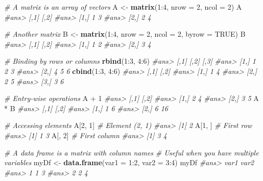 \documentclass[]{book}
\newenvironment{Shaded}{\begin{snugshade}}{\end{snugshade}}
\newcommand{\KeywordTok}[1]{\textcolor[rgb]{0.13,0.29,0.53}{\textbf{{#1}}}}
\newcommand{\DataTypeTok}[1]{\textcolor[rgb]{0.13,0.29,0.53}{{#1}}}
\newcommand{\DecValTok}[1]{\textcolor[rgb]{0.00,0.00,0.81}{{#1}}}
\newcommand{\StringTok}[1]{\textcolor[rgb]{0.31,0.60,0.02}{{#1}}}
\newcommand{\CommentTok}[1]{\textcolor[rgb]{0.56,0.35,0.01}{\textit{{#1}}}}
\newcommand{\OtherTok}[1]{\textcolor[rgb]{0.56,0.35,0.01}{{#1}}}
\newcommand{\NormalTok}[1]{{#1}}
\begin{document}
\begin{Shaded}
\begin{Highlighting}[]
\CommentTok{# A matrix is an array of vectors}
\NormalTok{A <-}\StringTok{ }\KeywordTok{matrix}\NormalTok{(}\DecValTok{1}\NormalTok{:}\DecValTok{4}\NormalTok{, }\DataTypeTok{nrow =} \DecValTok{2}\NormalTok{, }\DataTypeTok{ncol =} \DecValTok{2}\NormalTok{)}
\NormalTok{A}
\CommentTok{#ans>      [,1] [,2]}
\CommentTok{#ans> [1,]    1    3}
\CommentTok{#ans> [2,]    2    4}

\CommentTok{# Another matrix}
\NormalTok{B <-}\StringTok{ }\KeywordTok{matrix}\NormalTok{(}\DecValTok{1}\NormalTok{:}\DecValTok{4}\NormalTok{, }\DataTypeTok{nrow =} \DecValTok{2}\NormalTok{, }\DataTypeTok{ncol =} \DecValTok{2}\NormalTok{, }\DataTypeTok{byrow =} \OtherTok{TRUE}\NormalTok{)}
\NormalTok{B}
\CommentTok{#ans>      [,1] [,2]}
\CommentTok{#ans> [1,]    1    2}
\CommentTok{#ans> [2,]    3    4}

\CommentTok{# Binding by rows or columns}
\KeywordTok{rbind}\NormalTok{(}\DecValTok{1}\NormalTok{:}\DecValTok{3}\NormalTok{, }\DecValTok{4}\NormalTok{:}\DecValTok{6}\NormalTok{)}
\CommentTok{#ans>      [,1] [,2] [,3]}
\CommentTok{#ans> [1,]    1    2    3}
\CommentTok{#ans> [2,]    4    5    6}
\KeywordTok{cbind}\NormalTok{(}\DecValTok{1}\NormalTok{:}\DecValTok{3}\NormalTok{, }\DecValTok{4}\NormalTok{:}\DecValTok{6}\NormalTok{)}
\CommentTok{#ans>      [,1] [,2]}
\CommentTok{#ans> [1,]    1    4}
\CommentTok{#ans> [2,]    2    5}
\CommentTok{#ans> [3,]    3    6}

\CommentTok{# Entry-wise operations}
\NormalTok{A +}\StringTok{ }\DecValTok{1}
\CommentTok{#ans>      [,1] [,2]}
\CommentTok{#ans> [1,]    2    4}
\CommentTok{#ans> [2,]    3    5}
\NormalTok{A *}\StringTok{ }\NormalTok{B}
\CommentTok{#ans>      [,1] [,2]}
\CommentTok{#ans> [1,]    1    6}
\CommentTok{#ans> [2,]    6   16}

\CommentTok{# Accessing elements}
\NormalTok{A[}\DecValTok{2}\NormalTok{, }\DecValTok{1}\NormalTok{] }\CommentTok{# Element (2, 1)}
\CommentTok{#ans> [1] 2}
\NormalTok{A[}\DecValTok{1}\NormalTok{, ] }\CommentTok{# First row}
\CommentTok{#ans> [1] 1 3}
\NormalTok{A[, }\DecValTok{2}\NormalTok{] }\CommentTok{# First column}
\CommentTok{#ans> [1] 3 4}

\CommentTok{# A data frame is a matrix with column names}
\CommentTok{# Useful when you have multiple variables}
\NormalTok{myDf <-}\StringTok{ }\KeywordTok{data.frame}\NormalTok{(}\DataTypeTok{var1 =} \DecValTok{1}\NormalTok{:}\DecValTok{2}\NormalTok{, }\DataTypeTok{var2 =} \DecValTok{3}\NormalTok{:}\DecValTok{4}\NormalTok{)}
\NormalTok{myDf}
\CommentTok{#ans>   var1 var2}
\CommentTok{#ans> 1    1    3}
\CommentTok{#ans> 2    2    4}


\end{Highlighting}
\end{Shaded}
\end{document}

